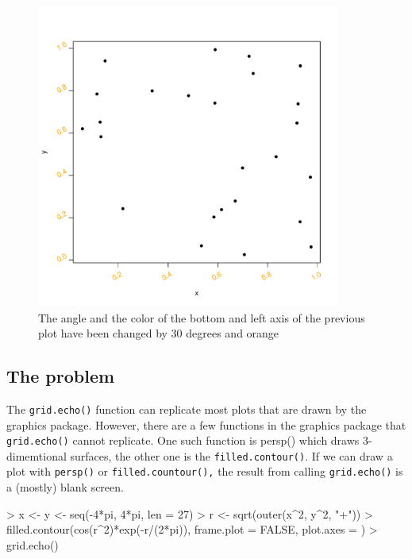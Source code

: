 \documentclass[a4paper,10pt]{article}
\begin{document}
\begin{figure}[h]
\begin{center}
  \includegraphics[height = 10cm, width = 10cm]{figure/report_basic_demo_4.pdf}
  \caption{The angle and the color of the bottom and left axis of the previous plot have been changed by 30 degrees and orange}
  	\label{figure3}
\end{center}
\end{figure}


\subsection{The problem}
The \texttt{grid.echo()} function can replicate most plots that are drawn by the graphics package. However, there are a few functions in the graphics package that \texttt{grid.echo()} cannot replicate. One such function is persp() which draws 3-dimemtional surfaces, the other one is the \texttt{filled.contour()}. If we can draw a plot with \texttt{persp()} or \texttt{filled.countour(),} the result from calling \texttt{grid.echo()} is a (mostly) blank screen. 


\begin{Schunk}
\begin{Sinput}
> x <- y <- seq(-4*pi, 4*pi, len = 27)
> r <- sqrt(outer(x^2, y^2, "+"))
> filled.contour(cos(r^2)*exp(-r/(2*pi)), frame.plot = FALSE, plot.axes = {})
> grid.echo()
\end{Sinput}
\end{Schunk}
\end{document}
